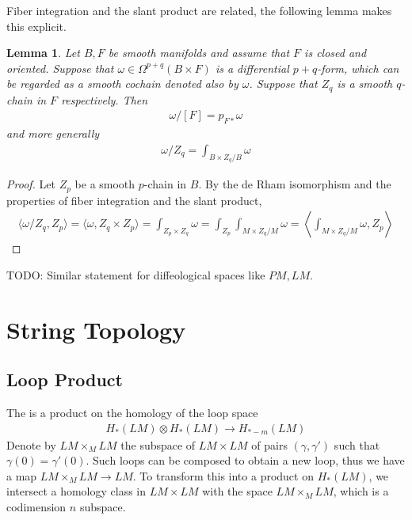 \documentclass{scrartcl}
\let\emph\relax
\newcommand{\emphi}[1]{\index{#1}\emph{#1}}
\theoremstyle{plain}
\newtheorem{lemma}[theorem]{Lemma}
\theoremstyle{definition}
\begin{document}
    Fiber integration and the slant product are related, the following lemma makes this explicit.
    \begin{lemma}
        Let $B, F$ be smooth manifolds and assume that $F$ is closed and oriented. Suppose that $\omega\in \Omega^{p+q}(B\times F)$ is a differential $p+q$-form, which can be regarded as a smooth cochain denoted also by $\omega$. Suppose that $Z_q$ is a smooth $q$-chain in $F$ respectively. Then 
        \begin{align*}
            \omega/[F] = p_{F*}\omega
        \end{align*}
        and more generally
        \begin{align*}
            \omega/Z_q = \int_{B\times Z_q / B} \omega
        \end{align*}
    \end{lemma}
    \begin{proof}
        Let $Z_p$ be a smooth $p$-chain in $B$. By the de Rham isomorphism and the properties of fiber integration and the slant product,
    \begin{align*}
        \langle \omega/Z_q, Z_p \rangle = \langle \omega, Z_q\times Z_p\rangle = \int_{Z_p\times Z_q}\omega = \int_{Z_p} \int_{M\times Z_q / M} \omega = \left\langle \int_{M\times Z_q / M}\omega, Z_p\right\rangle
    \end{align*}
    \end{proof}

    TODO: Similar statement for diffeological spaces like $PM, LM$.








\section{String Topology}

\subsection{Loop Product}
The \emphi{loop product} is a product on the homology of the loop space 
\begin{align*}
    H_*(LM)\otimes H_*(LM)\to H_{*-m}(LM)
\end{align*}
Denote by $LM\times_M LM$ the subspace of $LM\times LM$ of pairs $(\gamma, \gamma')$ such that $\gamma(0) = \gamma'(0)$. Such loops can be composed to obtain a new loop, thus we have a map $LM\times_M LM\to LM$. To transform this into a product on $H_*(LM)$, we intersect a homology class in $LM\times LM$ with the space $LM\times_M LM$, which is a codimension $n$ subspace.
\end{document}
